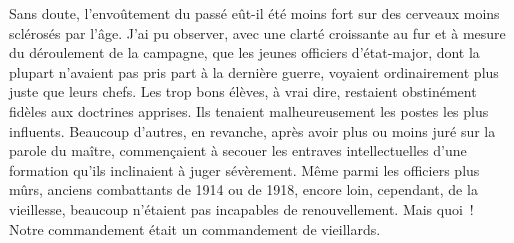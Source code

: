 \documentclass[french,twoside]{book} %
\begin{document}
Sans doute, l’envoûtement du passé eût-il été moins fort sur des cerveaux moins sclérosés par l’âge. J’ai pu observer, avec une clarté croissante au fur et à mesure du déroulement de la campagne, que les jeunes officiers d’état-major, dont la plupart n’avaient pas pris part à la dernière guerre, voyaient ordinairement plus juste que leurs chefs. Les trop bons élèves, à vrai dire, restaient obstinément fidèles aux doctrines apprises. Ils tenaient malheureusement   les postes les plus influents. Beaucoup d’autres, en revanche, après avoir plus ou moins juré sur la parole du maître, commençaient à secouer les entraves intellectuelles d’une formation qu’ils inclinaient à juger sévèrement. Même parmi les officiers plus mûrs, anciens combattants de 1914 ou de 1918, encore loin, cependant, de la vieillesse, beaucoup n’étaient pas incapables de renouvellement. Mais quoi ! Notre commandement était un commandement de vieillards.\par
\end{document}
